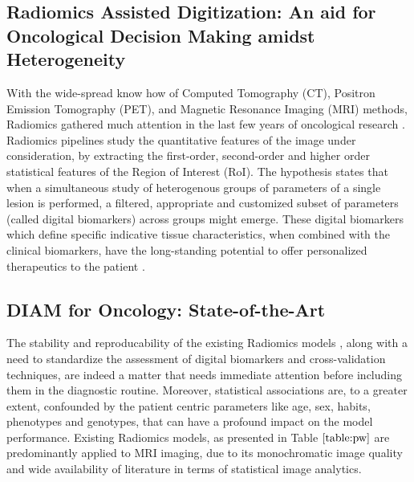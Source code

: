 \documentclass[final,1p,times,twocolumn]{elsarticle}
\begin{document}
\subsection{Radiomics Assisted Digitization: An aid for Oncological Decision Making amidst Heterogeneity}

With the wide-spread know how of Computed Tomography (CT), Positron Emission Tomography (PET), and Magnetic Resonance Imaging (MRI) methods, Radiomics gathered much attention in the last few years of oncological research \cite{6}. Radiomics pipelines study the quantitative features of the image under consideration, by extracting the first-order, second-order and higher order statistical features of the Region of Interest (RoI). The hypothesis states that when a simultaneous study of heterogenous groups of parameters of a single lesion is performed, a filtered, appropriate and customized subset of parameters (called digital biomarkers) \cite{7} across groups might emerge. These digital biomarkers which define specific indicative tissue characteristics, when combined with the clinical biomarkers, have the long-standing potential to offer personalized therapeutics to the patient \cite{a}.

\subsection{DIAM for Oncology: State-of-the-Art}
The stability and reproducability of the existing Radiomics models \cite{8} \cite{9}, along with a need to standardize the assessment of digital biomarkers and cross-validation techniques, are indeed a matter that needs immediate attention before including them in the diagnostic routine. Moreover, statistical associations are, to a greater extent, confounded by the patient centric parameters like age, sex, habits, phenotypes and genotypes, that can have a profound impact on the model performance. Existing Radiomics models, as presented in Table $\ref{table:pw}$ are predominantly applied to MRI imaging, due to its monochromatic image quality and wide availability of literature in terms of statistical image analytics.
\end{document}
